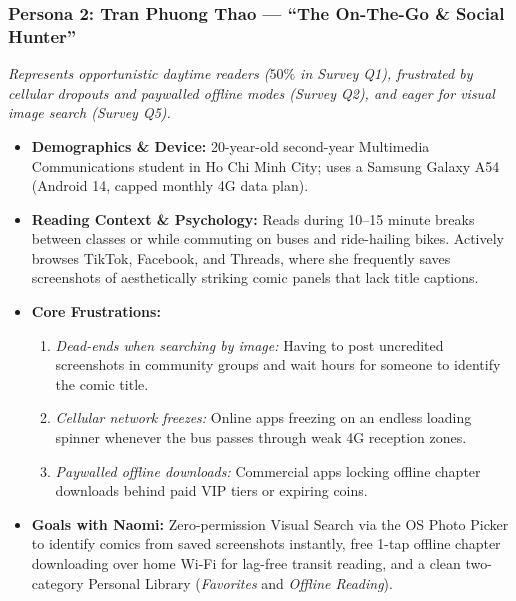 \subsubsection{Persona 2: Tran Phuong Thao --- ``The On-The-Go \& Social Hunter''}
\textit{Represents opportunistic daytime readers ($50\%$ in Survey Q1), frustrated by cellular dropouts and paywalled offline modes (Survey Q2), and eager for visual image search (Survey Q5).}
\begin{itemize}
    \item \textbf{Demographics \& Device:} 20-year-old second-year Multimedia Communications student in Ho Chi Minh City; uses a Samsung Galaxy A54 (Android 14, capped monthly 4G data plan).
    \item \textbf{Reading Context \& Psychology:} Reads during 10--15 minute breaks between classes or while commuting on buses and ride-hailing bikes. Actively browses TikTok, Facebook, and Threads, where she frequently saves screenshots of aesthetically striking comic panels that lack title captions.
    \item \textbf{Core Frustrations:}
    \begin{enumerate}[label=(\alph*)]
        \item \textit{Dead-ends when searching by image:} Having to post uncredited screenshots in community groups and wait hours for someone to identify the comic title.
        \item \textit{Cellular network freezes:} Online apps freezing on an endless loading spinner whenever the bus passes through weak 4G reception zones.
        \item \textit{Paywalled offline downloads:} Commercial apps locking offline chapter downloads behind paid VIP tiers or expiring coins.
    \end{enumerate}
    \item \textbf{Goals with Naomi:} Zero-permission Visual Search via the OS Photo Picker to identify comics from saved screenshots instantly, free 1-tap offline chapter downloading over home Wi-Fi for lag-free transit reading, and a clean two-category Personal Library (\textit{Favorites} and \textit{Offline Reading}).
\end{itemize}

